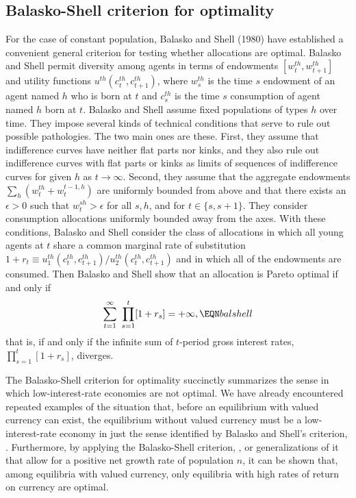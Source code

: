 \subsection{Balasko-Shell criterion for optimality}
For the case of constant population, Balasko and Shell (1980) have
established a convenient general criterion for testing whether
allocations are optimal.
Balasko and Shell permit diversity among agents in terms of
endowments $[w^{th}_t, w^{th}_{t+1}]$ and utility functions
$u^{th}(c^{th}_t, c^{th}_{t+1})$, where $w^{th}_s$ is the time $s$
endowment of an agent named $h$ who is born at $t$ and $c^{th}_s$
is the time $s$ consumption of agent named $h$ born at $t$.
Balasko and Shell
 assume  fixed populations of types $h$ over time. They
impose several kinds of technical
conditions that serve to rule out possible pathologies.  The two main
ones are these.
First, they assume that indifference curves have neither flat parts nor kinks,
and they also rule out indifference curves with flat parts or kinks as limits
of sequences of indifference curves for given $h$ as $t\to\infty$.  Second,
they assume that the aggregate endowments $\sum_h (w^{th}_t + w^{t-1,h}_t)$
are uniformly bounded from above and that there exists an $\epsilon>0$
 such that
$w^{sh}_t>\epsilon$ for all $s,h$, and for $t\in\{s,s+1\}$.  They consider
consumption allocations
uniformly bounded away from the axes.  With these conditions, Balasko and Shell
consider the class of allocations in which all young agents at $t$ share a
common marginal rate of substitution $1+r_t
\equiv u^{th}_1(c^{th}_t,c^{th}_{t+1})
/u^{th}_2(c^{th}_t,c^{th}_{t+1})$ and in which all of the endowments
are consumed.  Then Balasko and Shell show that an allocation is Pareto
optimal if and only if
$$\sum_{t=1}^\infty\ \prod_{s=1}^t  [1+r_s]=+\infty,
\EQN balshell$$
that is, if and only if the infinite sum of $t$-period gross interest rates,
$\prod_{s=1}^t [1+r_s]$, diverges.

The Balasko-Shell criterion for optimality succinctly summarizes the sense in
which low-interest-rate economies are not optimal.  We have already encountered
repeated examples of the situation that, before an equilibrium with valued
currency can exist, the equilibrium without valued currency must be a
low-interest-rate economy in just the sense identified by Balasko and Shell's
criterion, .  Furthermore, by applying the
Balasko-Shell criterion,
,
 or  generalizations of it that allow for a positive net growth
rate of population $n$, it can be shown that, among equilibria with valued
currency, only equilibria with high rates of return on currency are optimal.


